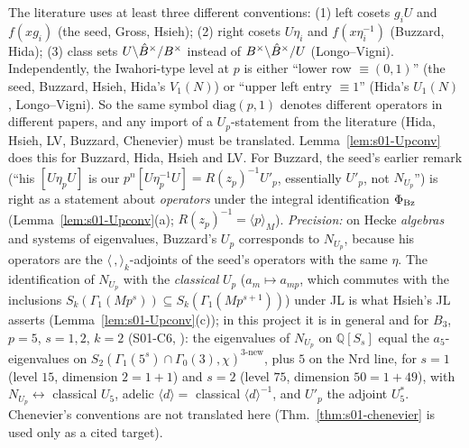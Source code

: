 \begin{remark}\label{rem:s01-Upconv}
The literature uses at least three different conventions: (1) left cosets $g_iU$ and $f(xg_i)$ (the seed, Gross, Hsieh); (2) right cosets
$U\eta_i$ and $f(x\eta_i^{-1})$ (Buzzard, Hida); (3) class sets $U\backslash\hat{B}^\times/B^\times$ instead of $B^\times\backslash\hat{B}^\times/U$ (Longo--Vigni).
Independently, the Iwahori-type level at $p$ is either ``lower row $\equiv(0,1)$'' (the seed, Buzzard, Hsieh, Hida's $V_1(N)$) or ``upper left entry
$\equiv1$'' (Hida's $U_1(N)$, Longo--Vigni). So the same symbol $\mathrm{diag}(p,1)$ denotes different operators in different papers, and any
import of a $U_p$-statement from the literature (Hida, Hsieh, LV, Buzzard, Chenevier) must be translated. Lemma~\ref{lem:s01-Upconv} does
this for Buzzard, Hida, Hsieh and LV. For Buzzard, the seed's earlier remark (``his $[U\eta_pU]$ is our $p^{n}[U\eta_p^{-1}U]=R(z_p)^{-1}U'_p$,
essentially $U'_p$, not $N_{U_p}$'') is right as a statement about \emph{operators} under the integral identification $\Phi_{\rm Bz}$
(Lemma~\ref{lem:s01-Upconv}(a); $R(z_p)^{-1}=\langle p\rangle_M$). \emph{Precision:} on Hecke \emph{algebras} and systems of eigenvalues,
Buzzard's $U_p$ corresponds to $N_{U_p}$, because his operators are the $\langle\,,\rangle_k$-adjoints of the seed's operators with the
same $\eta$. The identification of $N_{U_p}$ with the \emph{classical} $U_p$ ($a_m\mapsto a_{mp}$, which commutes with the inclusions
$S_k(\Gamma_1(Mp^s))\subseteq S_k(\Gamma_1(Mp^{s+1}))$) under JL is what Hsieh's JL asserts (Lemma~\ref{lem:s01-Upconv}(c)); in this
project it is \stexp{} in general and \stcomp{} for $B_3$, $p=5$, $s=1,2$, $k=2$ (S01-C6, ): the eigenvalues of $N_{U_p}$ on $\mathbb{Q}[S_s]$ equal the $a_5$-eigenvalues on $S_2(\Gamma_1(5^s)\cap\Gamma_0(3),\chi)^{3\text{-new}}$, plus $5$ on the $\mathrm{Nrd}$ line, for $s=1$ (level $15$, dimension $2=1+1$) and $s=2$ (level $75$, dimension $50=1+49$), with $N_{U_p}\leftrightarrow$ classical $U_5$, adelic $\langle d\rangle=$ classical $\langle d\rangle^{-1}$, and $U'_p$ the adjoint $U_5^*$. Chenevier's conventions are not translated here
(Thm.~\ref{thm:s01-chenevier} is used only as a cited target).
\end{remark}

